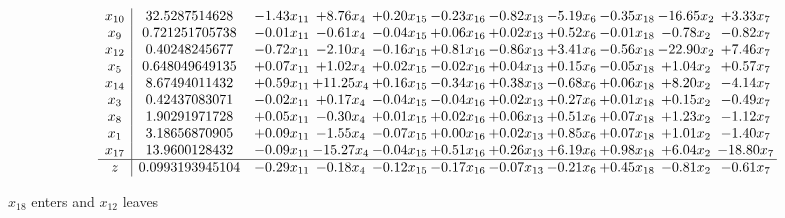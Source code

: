 \documentclass[9pt]{article}
\begin{document}
 \[\begin{array}{c| c c@{\hskip 2pt} c@{\hskip 2pt} c@{\hskip 2pt} c@{\hskip 2pt} c@{\hskip 2pt} c@{\hskip 2pt} c@{\hskip 2pt} c@{\hskip 2pt} c@{\hskip 2pt} }
 x_{10}   &  32.5287514628 & -1.43 x_{11} & +  8.76 x_{4} & +  0.20 x_{15} & -0.23 x_{16} & -0.82 x_{13} & -5.19 x_{6} & -0.35 x_{18} & -16.65 x_{2} & +  3.33 x_{7}\\
 x_{9}   &  0.721251705738 & -0.01 x_{11} & -0.61 x_{4} & -0.04 x_{15} & +  0.06 x_{16} & +  0.02 x_{13} & +  0.52 x_{6} & -0.01 x_{18} & -0.78 x_{2} & -0.82 x_{7}\\
 x_{12}   &  0.40248245677 & -0.72 x_{11} & -2.10 x_{4} & -0.16 x_{15} & +  0.81 x_{16} & -0.86 x_{13} & +  3.41 x_{6} & -0.56 x_{18} & -22.90 x_{2} & +  7.46 x_{7}\\
 x_{5}   &  0.648049649135 & +  0.07 x_{11} & +  1.02 x_{4} & +  0.02 x_{15} & -0.02 x_{16} & +  0.04 x_{13} & +  0.15 x_{6} & -0.05 x_{18} & +  1.04 x_{2} & +  0.57 x_{7}\\
 x_{14}   &  8.67494011432 & +  0.59 x_{11} & + 11.25 x_{4} & +  0.16 x_{15} & -0.34 x_{16} & +  0.38 x_{13} & -0.68 x_{6} & +  0.06 x_{18} & +  8.20 x_{2} & -4.14 x_{7}\\
 x_{3}   &  0.42437083071 & -0.02 x_{11} & +  0.17 x_{4} & -0.04 x_{15} & -0.04 x_{16} & +  0.02 x_{13} & +  0.27 x_{6} & +  0.01 x_{18} & +  0.15 x_{2} & -0.49 x_{7}\\
 x_{8}   &  1.90291971728 & +  0.05 x_{11} & -0.30 x_{4} & +  0.01 x_{15} & +  0.02 x_{16} & +  0.06 x_{13} & +  0.51 x_{6} & +  0.07 x_{18} & +  1.23 x_{2} & -1.12 x_{7}\\
 x_{1}   &  3.18656870905 & +  0.09 x_{11} & -1.55 x_{4} & -0.07 x_{15} & +  0.00 x_{16} & +  0.02 x_{13} & +  0.85 x_{6} & +  0.07 x_{18} & +  1.01 x_{2} & -1.40 x_{7}\\
 x_{17}   &  13.9600128432 & -0.09 x_{11} & -15.27 x_{4} & -0.04 x_{15} & +  0.51 x_{16} & +  0.26 x_{13} & +  6.19 x_{6} & +  0.98 x_{18} & +  6.04 x_{2} & -18.80 x_{7}\\
\hline
z    &  0.0993193945104 & -0.29 x_{11} & -0.18 x_{4} & -0.12 x_{15} & -0.17 x_{16} & -0.07 x_{13} & -0.21 x_{6} & +  0.45 x_{18} & -0.81 x_{2} & -0.61 x_{7}\\
\end{array}\]


 $ x_{18} $ enters and $ x_{12} $ leaves 
\end{document}
